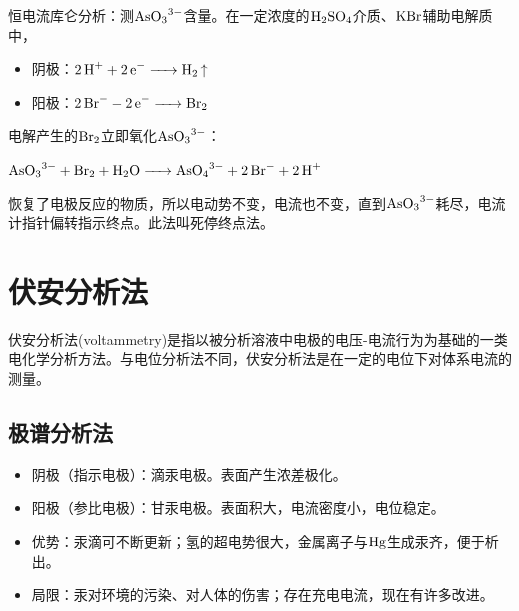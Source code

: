 \begin{example}
	恒电流库仑分析：测$\ce{AsO3^3-}$含量。在一定浓度的$\ce{H2SO4}$介质、$\ce{KBr}$辅助电解质中，
	
	\begin{itemize}
		\item 阴极：$\ce{2H+ + 2e- -> H2 ^ }$
		\item 阳极：$\ce{2Br- - 2e- -> Br2}$
	\end{itemize}

	电解产生的$\ce{Br2}$立即氧化$\ce{AsO3^3-}$：
	
	$\ce{AsO3^3- + Br2 + H2O -> AsO4^3- + 2Br- + 2H+}$
	
	恢复了电极反应的物质，所以电动势不变，电流也不变，直到$\ce{AsO3^3-}$耗尽，电流计指针偏转指示终点。此法叫死停终点法。
\end{example}


\section{伏安分析法}

伏安分析法(voltammetry)是指以被分析溶液中电极的电压-电流行为为基础的一类电化学分析方法。与电位分析法不同，伏安分析法是在一定的电位下对体系电流的测量。

\subsection{极谱分析法}

\begin{itemize}
	\item 阴极（指示电极）：滴汞电极。表面产生浓差极化。
	\item 阳极（参比电极）：甘汞电极。表面积大，电流密度小，电位稳定。
	\item 优势：汞滴可不断更新；氢的超电势很大，金属离子与$\ce{Hg}$生成汞齐，便于析出。
	\item 局限：汞对环境的污染、对人体的伤害；存在充电电流，现在有许多改进。
\end{itemize}

